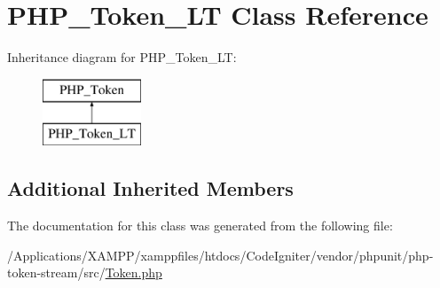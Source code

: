 \hypertarget{class_p_h_p___token___l_t}{}\section{P\+H\+P\+\_\+\+Token\+\_\+\+LT Class Reference}
\label{class_p_h_p___token___l_t}
Inheritance diagram for P\+H\+P\+\_\+\+Token\+\_\+\+LT\+:\begin{figure}[H]
\begin{center}
\leavevmode
\includegraphics[height=2.000000cm]{class_p_h_p___token___l_t}
\end{center}
\end{figure}
\subsection*{Additional Inherited Members}


The documentation for this class was generated from the following file\+:\begin{DoxyCompactItemize}
\item 
/\+Applications/\+X\+A\+M\+P\+P/xamppfiles/htdocs/\+Code\+Igniter/vendor/phpunit/php-\/token-\/stream/src/\mbox{\hyperlink{_token_8php}{Token.\+php}}\end{DoxyCompactItemize}
